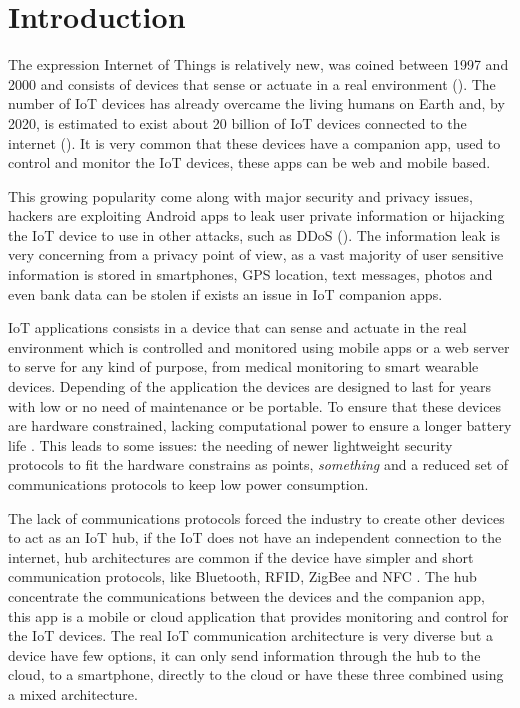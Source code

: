 \chapter{Introduction}

The expression Internet of Things is relatively new, was coined between 1997 and 2000 and consists of devices that sense or actuate in a real environment (\cite{minerva2015towards}). The number of IoT devices has already overcame the living humans on Earth and, by 2020, is estimated to exist about 20 billion of IoT devices connected to the internet (\cite{iotmarket}). It is very common that these devices have a companion app, used to control and monitor the IoT devices, these apps can be web and mobile based.

This growing popularity come along with major security and privacy issues, hackers are exploiting Android apps to leak user private information or hijacking the IoT device to use in other attacks, such as DDoS (\cite{ycraig}). The information leak is very concerning from a privacy point of view, as a vast majority of user sensitive information is stored in smartphones, GPS location, text messages, photos and even bank data can be stolen if exists an issue in IoT companion apps.

IoT applications consists in a device that can sense and actuate in the real environment which is controlled and monitored using mobile apps or a web server to serve for any kind of purpose, from medical monitoring to smart wearable devices. Depending of the application the devices are designed to last for years with low or no need of maintenance or be portable. To ensure that these devices are hardware constrained, lacking computational power to ensure a longer battery life \cite{raj2017internet}. This leads to some issues: the needing of newer lightweight security protocols to fit the hardware constrains as \cite{zhang2014iot} points, \textit{something} and a reduced set of communications protocols to keep low power consumption.

The lack of communications protocols forced the industry to create other devices to act as an IoT hub, if the IoT does not have an independent connection to the internet, hub architectures are common if the device have simpler and short communication protocols, like Bluetooth, RFID, ZigBee and NFC \cite{al2017internet}. The hub concentrate the communications between the devices and the companion app, this app is a mobile or cloud application that provides monitoring and control for the IoT devices. The real IoT communication architecture is very diverse but a device have few options, it can only send information through the hub to the cloud, to a smartphone, directly to the cloud or have these three combined using a mixed architecture.

